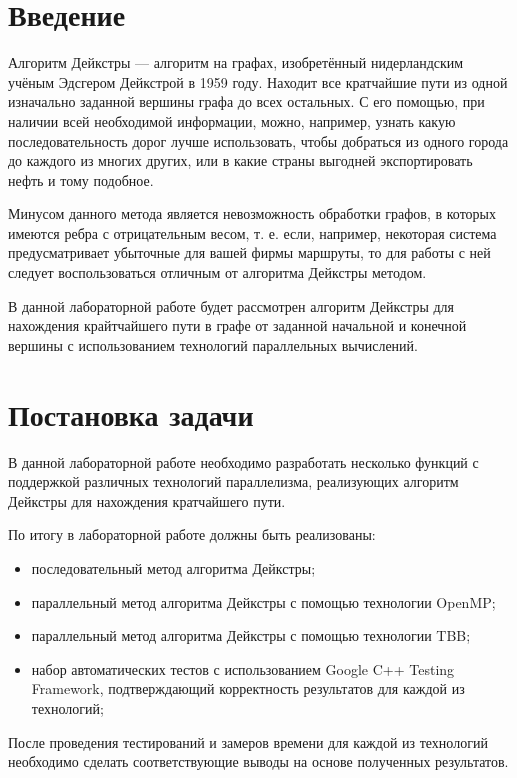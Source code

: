 \documentclass{report}
\begin{document}
\setcounter{page}{2}

\tableofcontents
\newpage

\section*{Введение}
Алгоритм Дейкстры — алгоритм на графах, изобретённый нидерландским учёным Эдсгером Дейкстрой в 1959 году. Находит все кратчайшие пути из одной изначально заданной вершины графа до всех остальных. С его помощью, при наличии всей необходимой информации, можно, например, узнать какую последовательность дорог лучше использовать, чтобы добраться из одного города до каждого из многих других, или в какие страны выгодней экспортировать нефть и тому подобное.
\par Минусом данного метода является невозможность обработки графов, в которых имеются ребра с отрицательным весом, т. е. если, например, некоторая система предусматривает убыточные для вашей фирмы маршруты, то для работы с ней следует воспользоваться отличным от алгоритма Дейкстры методом.
\par В данной лабораторной работе будет рассмотрен алгоритм Дейкстры для нахождения крайтчайшего пути в графе от заданной начальной и конечной вершины с использованием технологий параллельных вычислений.
\newpage

\section*{Постановка задачи}
В данной лабораторной работе необходимо разработать несколько функций с поддержкой различных технологий параллелизма, реализующих алгоритм Дейкстры для нахождения кратчайшего пути.
\par По итогу в лабораторной работе должны быть реализованы:
\begin{itemize}
\item последовательный метод алгоритма Дейкстры;
\item параллельный метод алгоритма Дейкстры с помощью технологии OpenMP;
\item параллельный метод алгоритма Дейкстры с помощью технологии TBB;
\item набор автоматических тестов с использованием Google C++ Testing Framework, подтверждающий корректность результатов для каждой из технологий;
\end{itemize}
\par После проведения тестирований и замеров времени для каждой из технологий необходимо сделать соответствующие выводы на основе полученных результатов.
\end{document}
